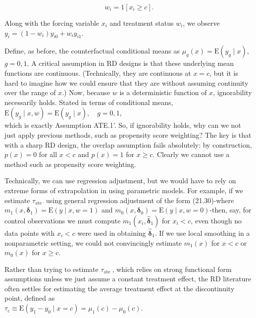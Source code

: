\documentclass[10pt]{article}
\begin{document}
\begin{equation*}
w_{i}=1\left[x_{i} \geq c\right] . \tag{21.95}
\end{equation*}


Along with the forcing variable $x_{i}$ and treatment status $w_{i}$, we observe $y_{i}= \left(1-w_{i}\right) y_{i 0}+w_{i} y_{i 1}$.

Define, as before, the counterfactual conditional means as $\mu_{g}(x)=\mathrm{E}\left(y_{g} \mid x\right)$, $g=0,1$. A critical assumption in RD designs is that these underlying mean functions are continuous. (Technically, they are continuous at $x=c$, but it is hard to imagine how we could ensure that they are without assuming continuity over the range of $x$.) Now, because $w$ is a deterministic function of $x$, ignorability necessarily holds. Stated in terms of conditional means,\\
$\mathrm{E}\left(y_{g} \mid x, w\right)=\mathrm{E}\left(y_{g} \mid x\right), \quad g=0,1$,\\
which is exactly Assumption ATE.1'. So, if ignorability holds, why can we not just apply previous methods, such as propensity score weighting? The key is that with a sharp RD design, the overlap assumption fails absolutely: by construction, $p(x)=0$ for all $x<c$ and $p(x)=1$ for $x \geq c$. Clearly we cannot use a method such as propensity score weighting.

Technically, we can use regression adjustment, but we would have to rely on extreme forms of extrapolation in using parametric models. For example, if we estimate $\tau_{\text {ate }}$ using general regression adjustment of the form (21.30)-where $m_{1}\left(x, \boldsymbol{\delta}_{1}\right)= \mathrm{E}(y \mid x, w=1)$ and $m_{0}\left(x, \boldsymbol{\delta}_{0}\right)=\mathrm{E}(y \mid x, w=0)$-then, say, for control observations we must compute $m_{1}\left(x_{i}, \hat{\boldsymbol{\delta}}_{1}\right)$ for $x_{i}<c$, even though no data points with $x_{i}<c$ were used in obtaining $\hat{\boldsymbol{\delta}}_{1}$. If we use local smoothing in a nonparametric setting, we could not convincingly estimate $m_{1}(x)$ for $x<c$ or $m_{0}(x)$ for $x \geq c$.

Rather than trying to estimate $\tau_{\text {ate }}$, which relies on strong functional form assumptions unless we just assume a constant treatment effect, the RD literature often settles for estimating the average treatment effect at the discontinuity point, defined as\\
$\tau_{c} \equiv \mathrm{E}\left(y_{1}-y_{0} \mid x=c\right)=\mu_{1}(c)-\mu_{0}(c)$.
\end{document}
